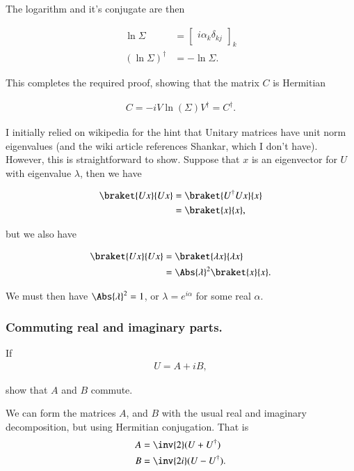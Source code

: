 The logarithm and it's conjugate are then

\begin{align}\label{eqn:desaiDiracNotes:11d}
\ln \Sigma &= 
{\begin{bmatrix}
i\alpha_k \delta_{kj}
\end{bmatrix}}_k \\
(\ln \Sigma)^\dagger &= -\ln \Sigma.
\end{align}

This completes the required proof, showing that the matrix $C$ is Hermitian

\begin{align}\label{eqn:desaiDiracNotes:11e}
C = -i V \ln ( \Sigma ) V^\dagger = C^\dagger.
\end{align}

I initially relied on wikipedia \citep{wiki:unitary} for the hint that Unitary matrices have unit norm eigenvalues (and the wiki article references Shankar, which I don't have).  However, this is straightforward to show.  Suppose that $x$ is an eigenvector for $U$ with eigenvalue $\lambda$, then we have

\begin{align*}
\braket{U x}{U x}
&= \braket{U^\dagger U x}{x} \\
&= \braket{x}{x},
\end{align*}

but we also have

\begin{align*}
\braket{U x}{U x}
&= \braket{\lambda x}{ \lambda x} \\
&= \Abs{\lambda}^2 \braket{x}{x}.
\end{align*}

We must then have $\Abs{\lambda}^2 = 1$, or $\lambda = e^{i\alpha}$ for some real $\alpha$.

\subsubsection{Commuting real and imaginary parts.}

If 
\begin{align}\label{eqn:desaiDiracNotes:4}
U = A + iB,
\end{align}

show that $A$ and $B$ commute.

We can form the matrices $A$, and $B$ with the usual real and imaginary decomposition, but using Hermitian conjugation.  That is
\begin{align}\label{eqn:desaiDiracNotes:5}
A &=
\inv{2} ( U + U^\dagger ) \\
B &=
\inv{2i} ( U - U^\dagger ).
\end{align}

